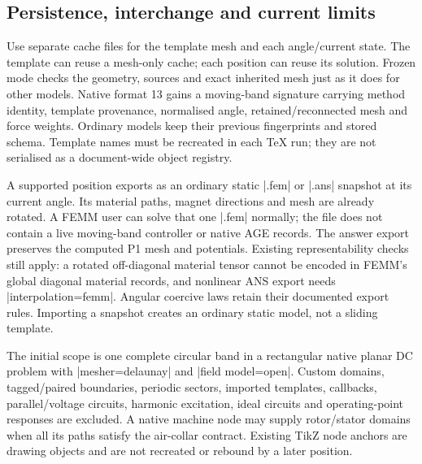 \subsection{Persistence, interchange and current limits}
Use separate cache files for the template mesh and each angle/current state.
The template can reuse a mesh-only cache; each position can reuse its solution.
Frozen mode checks the geometry, sources and exact inherited mesh just as it
does for other models. Native format 13 gains a moving-band signature carrying
method identity, template provenance, normalised angle, retained/reconnected
mesh and force weights. Ordinary models keep their previous fingerprints and
stored schema. Template names must be recreated in each TeX run; they are not
serialised as a document-wide object registry.

A supported position exports as an ordinary static |.fem| or |.ans| snapshot
at its current angle. Its material paths, magnet directions and mesh are already
rotated. A FEMM user can solve that one |.fem| normally; the file does not contain
a live moving-band controller or native AGE records. The answer export preserves
the computed P1 mesh and potentials. Existing representability checks still
apply: a rotated off-diagonal material tensor cannot be encoded in FEMM's
global diagonal material records, and nonlinear ANS export needs
|interpolation=femm|. Angular coercive laws retain their documented export rules.
Importing a snapshot creates an ordinary static model, not a sliding template.

The initial scope is one complete circular band in a rectangular native planar
DC problem with |mesher=delaunay| and |field model=open|. Custom domains,
tagged/paired boundaries, periodic sectors, imported templates, callbacks,
parallel/voltage circuits, harmonic excitation, ideal circuits and operating-point
responses are excluded. A native machine node may supply rotor/stator domains
when all its paths satisfy the air-collar contract. Existing TikZ node anchors
are drawing objects and are not recreated or rebound by a later position.

